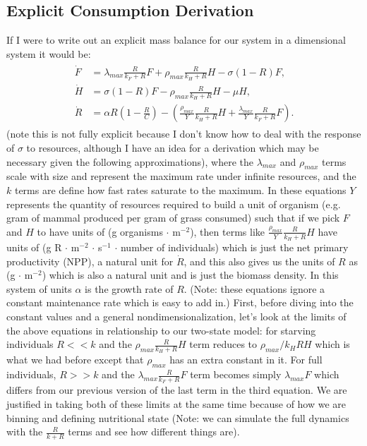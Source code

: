 \documentclass{pnastwo}
\begin{document}
\begin{article}

\section*{Explicit Consumption Derivation}
If I were to write out an explicit mass balance for our system in a dimensional system it would be:
\begin{align} 
\begin{split}
\dot{F} &= \lambda_{max}\frac{R}{k_{F}+R} F + \rho_{max}\frac{R}{k_{H}+R}H - \sigma (1-R)F,  \\
\dot{H} &= \sigma (1-R)F - \rho_{max}\frac{R}{k_{H}+R}H - \mu H,  \\
\dot{R} &= \alpha R\left(1-\frac{R}{C}\right) -\left(\frac{\rho_{max}}{Y}\frac{R}{k_{H}+R}H+\frac{\lambda_{max}}{Y}\frac{R}{k_{F}+R}F\right).
\end{split}
\end{align}
(note this is not fully explicit because I don't know how to deal with the response of $\sigma$ to resources, although I have an idea for a derivation which may be necessary given the following approximations), where the $\lambda_{max}$ and $\rho_{max}$ terms scale with size and represent the maximum rate under infinite resources, and the $k$ terms are define how fast rates saturate to the maximum. In these equations $Y$ represents the quantity of resources required to build a unit of organism (e.g. gram of mammal produced per gram of grass consumed) such that if we pick $F$ and $H$ to have units of (g organisms $\cdot$ m$^{-2}$), then terms like $\frac{\rho_{max}}{Y}\frac{R}{k_{H}+R}H$ have units of (g R $\cdot$ m$^{-2}$ $\cdot$ s$^{-1}$ $\cdot$ number of individuals) which is just the net primary productivity (NPP), a natural unit for $\dot{R}$, and this also gives us the units of $R$ as (g $\cdot$ m$^{-2}$) which is also a natural unit and is just the biomass density. In this system of units $\alpha$ is the growth rate of $R$. (Note: these equations ignore a constant maintenance rate which is easy to add in.) First, before diving into the constant values and a general nondimensionalization, let's look at the limits of the above equations in relationship to our two-state model: for starving individuals $R<<k$ and the $\rho_{max}\frac{R}{k_{H}+R}H$ term reduces to $\rho_{max}/k_{H}RH$ which is what we had before except that $\rho_{max}$ has an extra constant in it. For full individuals,  $R>>k$ and the $\lambda_{max}\frac{R}{k_{F}+R} F$ term becomes simply $\lambda_{max}F$ which differs from our previous version of the last term in the third equation. We are justified in taking both of these limits at the same time because of how we are binning and defining nutritional state (Note: we can simulate the full dynamics with the $\frac{R}{k+R}$ terms and see how different things are). 


\end{article}
\end{document}
